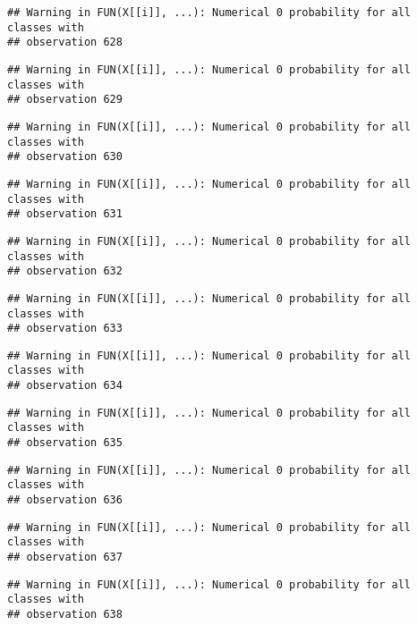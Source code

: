 \documentclass[
]{article}
\begin{document}
\begin{verbatim}
## Warning in FUN(X[[i]], ...): Numerical 0 probability for all classes with
## observation 628
\end{verbatim}

\begin{verbatim}
## Warning in FUN(X[[i]], ...): Numerical 0 probability for all classes with
## observation 629
\end{verbatim}

\begin{verbatim}
## Warning in FUN(X[[i]], ...): Numerical 0 probability for all classes with
## observation 630
\end{verbatim}

\begin{verbatim}
## Warning in FUN(X[[i]], ...): Numerical 0 probability for all classes with
## observation 631
\end{verbatim}

\begin{verbatim}
## Warning in FUN(X[[i]], ...): Numerical 0 probability for all classes with
## observation 632
\end{verbatim}

\begin{verbatim}
## Warning in FUN(X[[i]], ...): Numerical 0 probability for all classes with
## observation 633
\end{verbatim}

\begin{verbatim}
## Warning in FUN(X[[i]], ...): Numerical 0 probability for all classes with
## observation 634
\end{verbatim}

\begin{verbatim}
## Warning in FUN(X[[i]], ...): Numerical 0 probability for all classes with
## observation 635
\end{verbatim}

\begin{verbatim}
## Warning in FUN(X[[i]], ...): Numerical 0 probability for all classes with
## observation 636
\end{verbatim}

\begin{verbatim}
## Warning in FUN(X[[i]], ...): Numerical 0 probability for all classes with
## observation 637
\end{verbatim}

\begin{verbatim}
## Warning in FUN(X[[i]], ...): Numerical 0 probability for all classes with
## observation 638
\end{verbatim}
\end{document}
